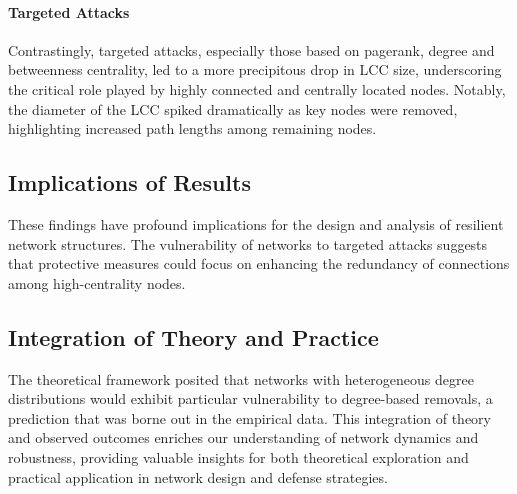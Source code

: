 \documentclass[
	report, %
	11pt, %
]{CSUniSchoolLabReport}
\newcounter{ct}
\begin{document}
\paragraph{Targeted Attacks}
Contrastingly, targeted attacks, especially those based on pagerank, degree and betweenness centrality, led to a more precipitous drop in LCC size, underscoring the critical role played by highly connected and centrally located nodes. Notably, the diameter of the LCC spiked dramatically as key nodes were removed, highlighting increased path lengths among remaining nodes.

\subsection{Implications of Results}

These findings have profound implications for the design and analysis of resilient network structures. The vulnerability of networks to targeted attacks suggests that protective measures could focus on enhancing the redundancy of connections among high-centrality nodes.

\subsection{Integration of Theory and Practice}

The theoretical framework posited that networks with heterogeneous degree distributions would exhibit particular vulnerability to degree-based removals, a prediction that was borne out in the empirical data. This integration of theory and observed outcomes enriches our understanding of network dynamics and robustness, providing valuable insights for both theoretical exploration and practical application in network design and defense strategies.

\clearpage
\end{document}

